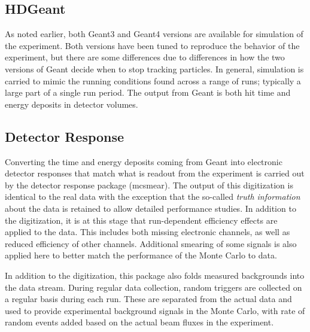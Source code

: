 \subsection{HDGeant \label{sec:hdgeant}}
As noted earlier, both Geant3 and Geant4 versions are available for simulation of the experiment. Both versions have been tuned to reproduce the behavior of the experiment, but there are some differences due to differences in how the two versions of Geant decide when to stop tracking particles. In general, simulation is carried to mimic the running conditions found across a range of runs; typically a large part of a single run period. The output from Geant is both hit time and energy deposits in detector volumes. 

\subsection[mcsmear]{Detector Response}
Converting the time and energy deposits coming from Geant into electronic detector responses that match what is readout from the experiment is carried out by the detector response package (mcsmear). The output of this digitization is identical to the real data with the exception that the so-called \emph{truth information} about the data is retained to allow detailed performance studies. In addition to the digitization, it is at this stage that run-dependent efficiency effects are applied to the data. This includes both missing electronic channels, as well as reduced efficiency of other channels. Additional smearing of some signals is also applied here to better match the performance of the Monte Carlo to data. 

In addition to the digitization, this package also folds measured backgrounds into the data stream. During regular data collection, random triggers are collected on a regular basis during each run. These are separated from the actual data and used to provide experimental background signals in the Monte Carlo, with rate of random events added based on the actual beam fluxes in the experiment. 

